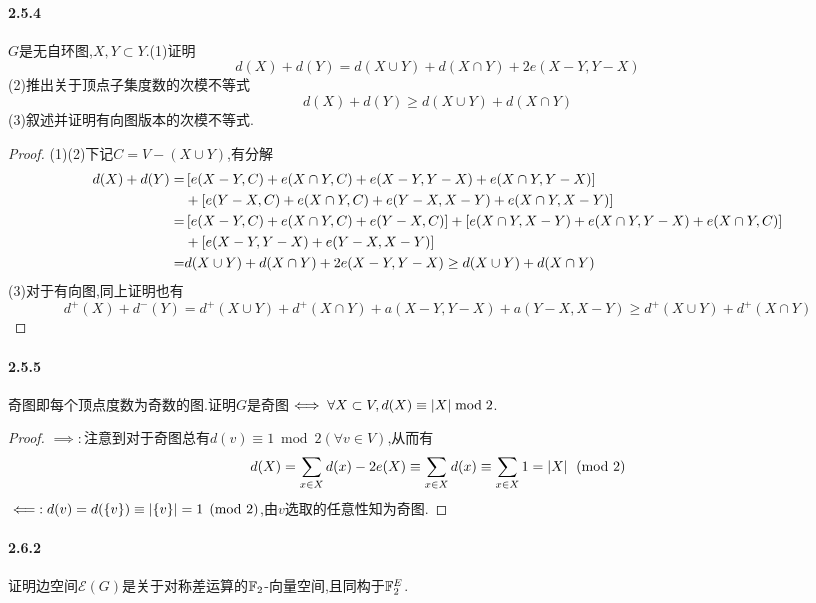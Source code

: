 \documentclass[11pt]{article}
\begin{document}
\paragraph{2.5.4}$G$是无自环图,$X,Y\subset Y$.(1)证明
$$d(X)+d(Y)=d(X\cup Y)+d(X\cap Y)+2e(X-Y,Y-X)$$
(2)推出关于顶点子集度数的次模不等式
$$d(X)+d(Y)\geq d(X\cup Y)+d(X\cap Y)$$
(3)叙述并证明有向图版本的次模不等式.
\begin{proof}
(1)(2)下记$C=V-(X\cup Y)$,有分解
$$\begin{aligned}
        d(X)+d(Y)= & \left[e(X-Y,C)+e(X\cap Y,C)+e(X-Y,Y-X)+e(X\cap Y,Y-X)\right]                                  \\
                   & +\left[e(Y-X,C)+e(X\cap Y,C)+e(Y-X,X-Y)+e(X\cap Y,X-Y)\right]                                 \\
        =          & \left[e(X-Y,C)+e(X\cap Y,C)+e(Y-X,C)\right]+\left[e(X\cap Y, X-Y)+e(X\cap Y,Y-X)+e(X\cap Y,C)\right] \\
                   & +\left[e(X-Y,Y-X)+e(Y-X,X-Y)\right]                                                           \\
        =          & d(X\cup Y)+d(X\cap Y)+2e(X-Y,Y-X)\geq d(X\cup Y)+d(X\cap Y)
    \end{aligned}$$
(3)对于有向图,同上证明也有
$$d^+(X)+d^-(Y)=d^+(X\cup Y)+d^+(X\cap Y)+a(X-Y,Y-X)+a(Y-X,X-Y)\geq d^+(X\cup Y)+d^+(X\cap Y)$$
\end{proof}

\paragraph{2.5.5}奇图即每个顶点度数为奇数的图.证明$G$是奇图$\iff \forall X\subset V, d(X)\equiv\left|X\right|\bmod 2$.

\begin{proof}
$\implies:$注意到对于奇图总有$d(v)\equiv 1\bmod 2 (\forall v\in V)$,从而有
$$d(X)=\sum_{x\in X}d(x)-2e(X)\equiv \sum_{x\in X}d(x)\equiv \sum_{x\in X}1=\left|X\right|\pmod 2$$
$\impliedby: d(v)=d(\left\{v\right\})\equiv \left|\left\{v\right\}\right|=1\pmod 2$,由$v$选取的任意性知为奇图.
\end{proof}

\paragraph{2.6.2}证明边空间$\mathcal{E}(G)$是关于对称差运算的$\mathbb{F}_2$-向量空间,且同构于$\mathbb{F}_2^E$.
\end{document}
